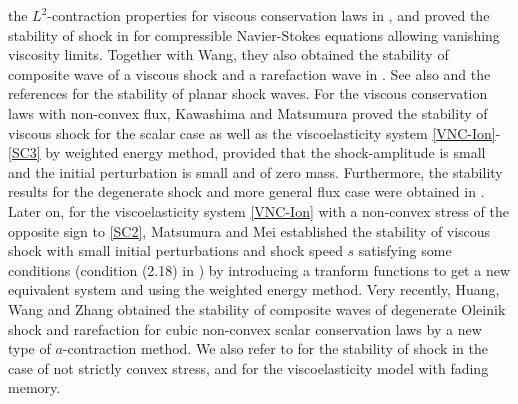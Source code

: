 \documentclass[12pt,reqno]{amsart}
\numberwithin{equation}{section}
\begin{document}
the $L^2$-contraction properties for viscous conservation laws in \cite{vasseur2,vasseurjmes}, and proved the stability of shock in \cite{vasseurinvent} for compressible Navier-Stokes equations allowing vanishing viscosity limits. Together with Wang, they also obtained the stability of composite wave of a viscous shock and a rarefaction wave in \cite{vasseurwang}.  See also \cite{GoodmanTAMS,wangjems} and the references for the stability of planar shock waves. For the viscous conservation laws with non-convex flux, Kawashima and Matsumura \cite{InitialModel} proved the stability of viscous shock for the scalar case as well as the viscoelasticity system \eqref{VNC-Ion}-\eqref{SC3} by weighted energy method, provided that the shock-amplitude is small and the initial perturbation is small and of zero mass. Furthermore, the stability results for the degenerate shock and more general flux case were obtained in  \cite{Matsumura-Nishihara1995,Nishihara.1995,meiM3AS,Meiming.1997}.  Later on, for the viscoelasticity system \eqref{VNC-Ion} with a non-convex stress of the opposite sign to \eqref{SC2},  Matsumura and Mei \cite{Gaijin} established the stability of viscous shock with small initial perturbations and shock speed $s$ satisfying some conditions (condition (2.18) in \cite{Gaijin}) by introducing a tranform functions to get a new equivalent system and using the weighted energy method. Very recently, Huang, Wang and Zhang\cite{HuangWangZhang} obtained the stability of composite waves of degenerate Oleinik shock and rarefaction for cubic non-convex scalar conservation laws by a new type of $a$-contraction method. We also refer to \cite{LiuGuo} for the stability of shock in the case of not 
strictly convex stress, and \cite{Liu1988, kawashima1993} for the viscoelasticity model with fading memory.
\end{document}
